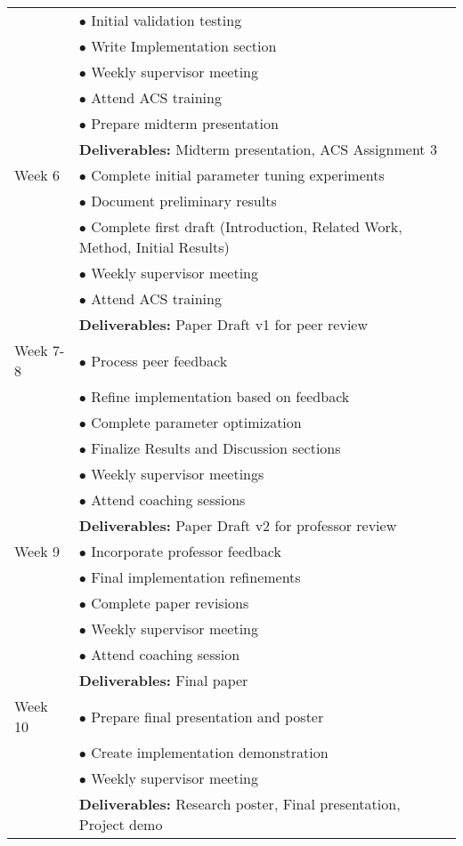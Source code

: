 \documentclass[english, a4paper]{article}
\begin{document}
\begin{tabular}{|p{}|p{}|}
& $\bullet$ Initial validation testing \\
& $\bullet$ Write Implementation section \\
& $\bullet$ Weekly supervisor meeting \\
& $\bullet$ Attend ACS training \\
& $\bullet$ Prepare midterm presentation \\
& \textbf{Deliverables:} Midterm presentation, ACS Assignment 3 \\
\hline
Week 6 & 
$\bullet$ Complete initial parameter tuning experiments \\
& $\bullet$ Document preliminary results \\
& $\bullet$ Complete first draft (Introduction, Related Work, Method, Initial Results) \\
& $\bullet$ Weekly supervisor meeting \\
& $\bullet$ Attend ACS training \\
& \textbf{Deliverables:} Paper Draft v1 for peer review \\
\hline
Week 7-8 & 
$\bullet$ Process peer feedback \\
& $\bullet$ Refine implementation based on feedback \\
& $\bullet$ Complete parameter optimization \\
& $\bullet$ Finalize Results and Discussion sections \\
& $\bullet$ Weekly supervisor meetings \\
& $\bullet$ Attend coaching sessions \\
& \textbf{Deliverables:} Paper Draft v2 for professor review \\
\hline
Week 9 & 
$\bullet$ Incorporate professor feedback \\
& $\bullet$ Final implementation refinements \\
& $\bullet$ Complete paper revisions \\
& $\bullet$ Weekly supervisor meeting \\
& $\bullet$ Attend coaching session \\
& \textbf{Deliverables:} Final paper \\
\hline
Week 10 & 
$\bullet$ Prepare final presentation and poster \\
& $\bullet$ Create implementation demonstration \\
& $\bullet$ Weekly supervisor meeting \\
& \textbf{Deliverables:} Research poster, Final presentation, Project demo \\
\hline
\end{tabular}

\pagebreak

\printbibliography
\end{document}
